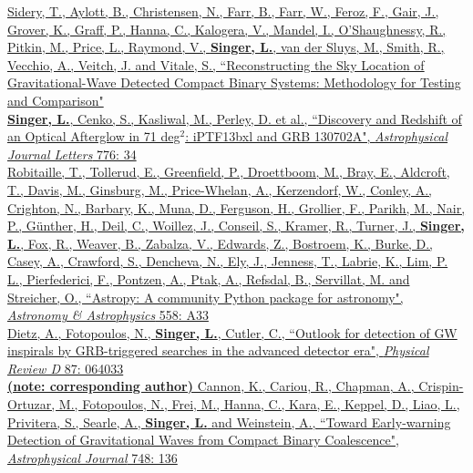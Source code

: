 \documentclass[10pt, letterpaper]{article} %
\newcommand{\years}[1]{\marginnote{\scriptsize #1}} %
\begin{document}
\years{2014}\href{http://dx.doi.org/10.1103/PhysRevD.89.084060}{Sidery, T., Aylott, B., Christensen, N., Farr, B., Farr, W., Feroz, F., Gair, J., Grover, K., Graff, P., Hanna, C., Kalogera, V., Mandel, I., O'Shaughnessy, R., Pitkin, M., Price, L., Raymond, V., \textbf{Singer, L.}, van der Sluys, M., Smith, R., Vecchio, A., Veitch, J. and Vitale, S., “Reconstructing the Sky Location of Gravitational-Wave Detected Compact Binary Systems: Methodology for Testing and Comparison"}\\[0.125cm]
%
\years{2013}\href{http://dx.doi.org/10.1088/2041-8205/776/2/L34}{\textbf{Singer, L.}, Cenko, S., Kasliwal, M., Perley, D. et al., “Discovery and Redshift of an Optical Afterglow in 71 deg$^2$: iPTF13bxl and GRB 130702A", \emph{Astrophysical Journal Letters} 776: 34}\\[0.125cm]
%
\years{2013}\href{http://dx.doi.org/10.1051/0004-6361/201322068}{Robitaille, T., Tollerud, E., Greenfield, P., Droettboom, M., Bray, E., Aldcroft, T., Davis, M., Ginsburg, M., Price-Whelan, A., Kerzendorf, W., Conley, A., Crighton, N., Barbary, K., Muna, D., Ferguson, H., Grollier, F., Parikh, M., Nair, P., Günther, H., Deil, C., Woillez, J., Conseil, S., Kramer, R., Turner, J., \textbf{Singer, L.}, Fox, R., Weaver, B., Zabalza, V., Edwards, Z., Bostroem, K., Burke, D., Casey, A., Crawford, S., Dencheva, N., Ely, J., Jenness, T., Labrie, K., Lim, P. L., Pierfederici, F., Pontzen, A., Ptak, A., Refsdal, B., Servillat, M. and Streicher, O., “Astropy: A community Python package for astronomy", \emph{Astronomy \& Astrophysics} 558: A33}\\[0.125cm]
%
\years{2013}\href{http://dx.doi.org/10.1103/PhysRevD.87.064033}{Dietz, A., Fotopoulos, N., \textbf{Singer, L.}, Cutler, C., “Outlook for detection of GW inspirals by GRB-triggered searches in the advanced detector era", \emph{Physical Review D} 87: 064033}\\[0.125cm]
%
\years{2012}\href{http://dx.doi.org/10.1088/0004-637X/748/2/136}{\textbf{(note: corresponding author)} Cannon, K., Cariou, R., Chapman, A., Crispin-Ortuzar, M., Fotopoulos, N., Frei, M., Hanna, C., Kara, E., Keppel, D., Liao, L., Privitera, S., Searle, A., \textbf{Singer, L.} and Weinstein, A., “Toward Early-warning Detection of Gravitational Waves from Compact Binary Coalescence", \emph{Astrophysical Journal} 748: 136}
\end{document}
